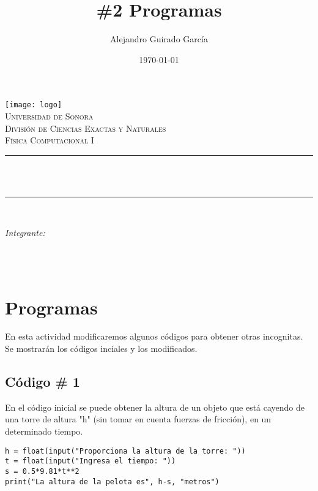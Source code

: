 \documentclass[12pt]{article}
\title{\#2 Programas}							%
\author{Alejandro Guirado García}											%
\date{\today} %
\makeatletter
\let\thetitle\@title
\let\theauthor\@author
\let\thedate\@date
\makeatother
\begin{document}

\begin{titlepage}
	\centering
    \vspace*{0.5 cm}
    \texttt{[image: logo]}\\[0.5 cm]	%
    \textsc{\Large Universidad de Sonora}\\[1.0 cm]	%
	\textsc{\Large División de Ciencias Exactas y Naturales}\\[0.5 cm]				%
	\textsc{\large Física Computacional I}\\[0.5 cm]				%
	\rule{\linewidth}{0.2 mm} \\[0.4 cm]
	{ \huge \bfseries \thetitle}\\
	\rule{\linewidth}{0.2 mm} \\[0.5 cm]
 
	
	\begin{minipage}{\textwidth}
		\begin{flushleft} 
			\emph{\Large Integrante:} \large \\
			\theauthor
			\end{flushleft}
	\end{minipage}\\[1 cm]
	{\large \thedate}\\[2 cm]
 
	\vfill
	
\end{titlepage}


\section{Programas}
En esta actividad modificaremos algunos códigos para obtener otras incognitas. Se mostrarán los códigos inciales y los modificados. 
\subsection{Código \# 1}

En el código inicial se puede obtener la altura de un objeto que está cayendo de una torre de altura "h" (sin tomar en cuenta fuerzas de fricción), en un determinado tiempo.

\begin{verbatim}
h = float(input("Proporciona la altura de la torre: "))
t = float(input("Ingresa el tiempo: "))
s = 0.5*9.81*t**2
print("La altura de la pelota es", h-s, "metros")
\end{verbatim}
\end{document}
